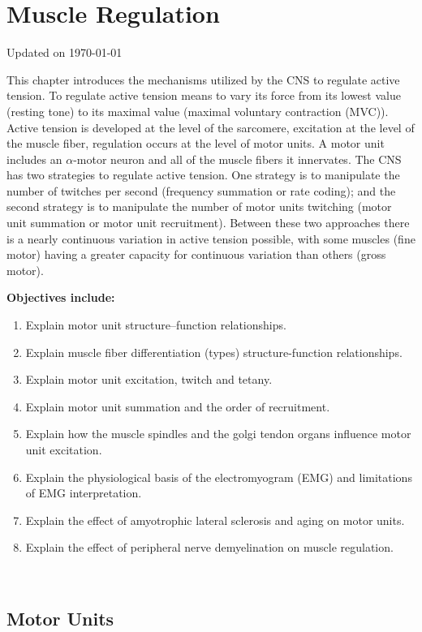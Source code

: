 \chapter{Muscle Regulation}\label{chp:regulation}
Updated on \today
\minitoc

This chapter introduces the mechanisms utilized by the CNS to regulate active tension. To regulate active tension means to vary its force from its lowest value (resting tone) to its maximal value (maximal voluntary contraction (MVC)). Active tension is developed at the level of the sarcomere, excitation at the level of the muscle fiber, regulation occurs at the level of motor units. A motor unit includes an $\alpha$-motor neuron and all of the muscle fibers it innervates. The CNS has two strategies to regulate active tension. One strategy is to manipulate the number of twitches per second (frequency summation or rate coding); and the second strategy is to manipulate the number of motor units twitching (motor unit summation or motor unit recruitment). Between these two approaches there is a nearly continuous variation in active tension possible, with some muscles (fine motor) having a greater capacity for continuous variation than others (gross motor).

\vspace{5mm}

\textbf{Objectives include:}
\begin{enumerate}
    \item Explain motor unit structure–function relationships.
    \item Explain muscle fiber differentiation (types) structure-function relationships.
    \item Explain motor unit excitation, twitch and tetany.
    \item Explain motor unit summation and the order of recruitment.
    \item Explain how the muscle spindles and the golgi tendon organs influence motor unit excitation.
    \item Explain the physiological basis of the electromyogram (EMG) and limitations of EMG interpretation.
    \item Explain the effect of amyotrophic lateral sclerosis and aging on motor units.
    \item Explain the effect of peripheral nerve demyelination on muscle regulation.
\end{enumerate}\

\section{Motor Units}

